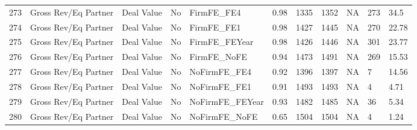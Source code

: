 \documentclass{article}
\begin{document}
\begin{table}[H]
\begin{tabular}{rllllllllll}
  273 & Gross Rev/Eq Partner & Deal Value & No & FirmFE\_FE4 & 0.98 & 1335 & 1352 & NA & 273 & 34.5 \\ 
  274 & Gross Rev/Eq Partner & Deal Value & No & FirmFE\_FE1 & 0.98 & 1427 & 1445 & NA & 270 & 22.78 \\ 
  275 & Gross Rev/Eq Partner & Deal Value & No & FirmFE\_FEYear & 0.98 & 1426 & 1446 & NA & 301 & 23.77 \\ 
  276 & Gross Rev/Eq Partner & Deal Value & No & FirmFE\_NoFE & 0.94 & 1473 & 1491 & NA & 269 & 15.53 \\ 
  277 & Gross Rev/Eq Partner & Deal Value & No & NoFirmFE\_FE4 & 0.92 & 1396 & 1397 & NA & 7 & 14.56 \\ 
  278 & Gross Rev/Eq Partner & Deal Value & No & NoFirmFE\_FE1 & 0.91 & 1493 & 1493 & NA & 4 & 4.71 \\ 
  279 & Gross Rev/Eq Partner & Deal Value & No & NoFirmFE\_FEYear & 0.93 & 1482 & 1485 & NA & 36 & 5.34 \\ 
  280 & Gross Rev/Eq Partner & Deal Value & No & NoFirmFE\_NoFE & 0.65 & 1504 & 1504 & NA & 4 & 1.24 \\ 
   \hline
\end{tabular}
\end{table}
\end{document}
